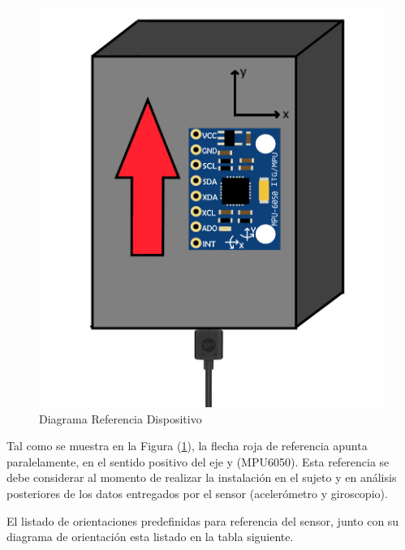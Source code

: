 \documentclass[12pt,a4paper]{article}
\begin{document}
\begin{figure}[H]
	\centering
	\includegraphics[scale=0.2]{images/referenciaDispositivo}
	\caption{Diagrama Referencia Dispositivo}
	\label{fig:referenciaDisp}
\end{figure}

Tal como se muestra en la Figura (\ref{fig:referenciaDisp}), la flecha roja de referencia apunta paralelamente, en el sentido positivo del eje y (MPU6050).
Esta referencia se debe considerar al momento de realizar la instalación en el sujeto y en análisis posteriores de los datos entregados por el sensor (acelerómetro y giroscopio).

\newpage

El listado de orientaciones predefinidas para referencia del sensor, junto con su diagrama de orientación esta listado en la tabla siguiente.
\end{document}
